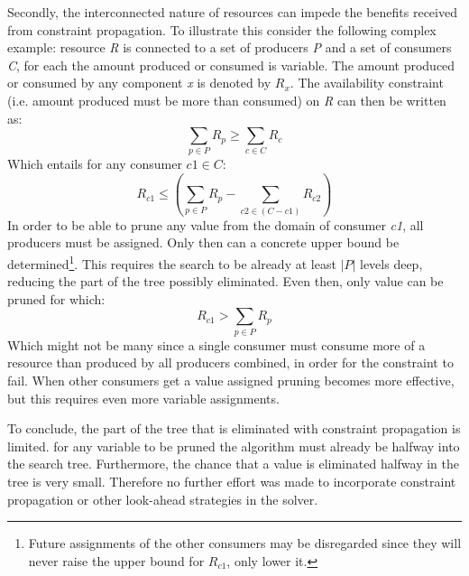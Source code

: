 Secondly, the interconnected nature of resources can impede the benefits received from constraint propagation. To illustrate this consider the following complex example: resource \emph{R} is connected to a set of producers \emph{P} and a set of consumers \emph{C}, for each the amount produced or consumed is variable. The amount produced or consumed by any component \emph{x} is denoted by $R_x$. The availability constraint (i.e. amount produced must be more than consumed) on \emph{R} can then be written as:
$$\sum_{p \in P}R_p \geq \sum_{c \in C}R_c$$
Which entails for any consumer $c1 \in C$: 
$$R_{c1} \leq \left(\sum_{p \in P} R_p - \sum_{c2 \in (C-c1)} R_{c2}\right)$$
In order to be able to prune any value from the domain of consumer \emph{c1}, all producers must be assigned. Only then can a concrete upper bound be determined\footnote{Future assignments of the other consumers may be disregarded since they will never raise the upper bound for $R_{c1}$, only lower it.}. This requires the search to be already at least $|P|$ levels deep, reducing the part of the tree possibly eliminated. Even then, only value can be pruned for which:
$$R_{c1} > \sum_{p \in P} R_p$$
Which might not be many since a single consumer must consume more of a resource than produced by all producers combined, in order for the constraint to fail. When other consumers get a value assigned pruning becomes more effective, but this requires even more variable assignments. 

To conclude, the part of the tree that is eliminated with constraint propagation is limited. for any variable to be pruned the algorithm must already be halfway into the search tree. Furthermore, the chance that a value is eliminated halfway in the tree is very small. Therefore no further effort was made to incorporate constraint propagation or other look-ahead strategies in the solver.



	









